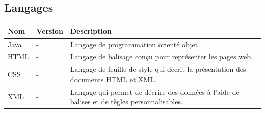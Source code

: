\subsection{\textbf{Langages}}
\noindent
\begin{tabular}{!{\color{white}\vrule}m{3.4cm}!{\color{white}\vrule}m{1.7cm}!{\color{white}\vrule}m{10.8cm}!{\color{white}\vrule}}


\hline
 \color{white} Nom & \color{white} Version & \color{white} Description\\


\hline
{} Java & - & Langage de programmation orienté objet.  \\

\hline
{} HTML & - & Langage de balisage conçu pour représenter les pages web. \\

\hline
{} CSS & - & Langage de feuille de style qui décrit la présentation des documents HTML et XML. \\

\hline
{} XML & - & Langage qui permet de décrire des données à l'aide de balises et de règles personnalisables.  \\

\end{tabular}

